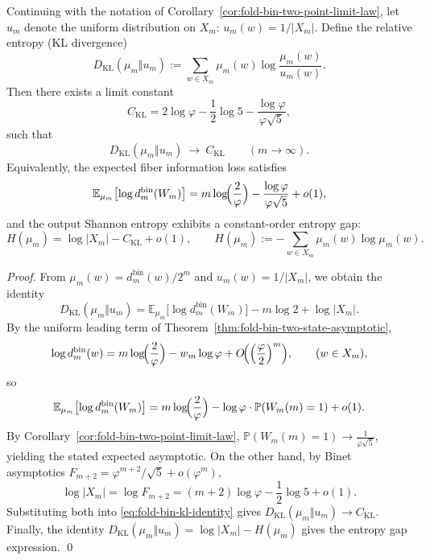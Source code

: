 \begin{proposition}\label{prop:fold-bin-kl-constant}
Continuing with the notation of Corollary~\ref{cor:fold-bin-two-point-limit-law},
let \(u_m\) denote the uniform distribution on \(X_m\): \(u_m(w)=1/|X_m|\).
Define the relative entropy (KL divergence)
\[
D_{\mathrm{KL}}(\mu_m\Vert u_m)
:=\sum_{w\in X_m}\mu_m(w)\log\frac{\mu_m(w)}{u_m(w)}.
\]
Then there exists a limit constant
\[
C_{\mathrm{KL}}
=2\log\varphi-\frac12\log 5-\frac{\log\varphi}{\varphi\sqrt5},
\]
such that
\[
D_{\mathrm{KL}}(\mu_m\Vert u_m)\ \longrightarrow\ C_{\mathrm{KL}}
\qquad(m\to\infty).
\]
Equivalently, the expected fiber information loss satisfies
\[
\mathbb{E}_{\mu_m}\bigl[\log d^{\mathrm{bin}}_m(W_m)\bigr]
=m\log\!\Bigl(\frac{2}{\varphi}\Bigr)-\frac{\log\varphi}{\varphi\sqrt5}+o(1),
\]
and the output Shannon entropy exhibits a constant-order entropy gap:
\[
H(\mu_m)=\log|X_m|-C_{\mathrm{KL}}+o(1),
\qquad
H(\mu_m):=-\sum_{w\in X_m}\mu_m(w)\log \mu_m(w).
\]
\end{proposition}

\begin{proof}
From \(\mu_m(w)=d^{\mathrm{bin}}_m(w)/2^m\) and \(u_m(w)=1/|X_m|\), we obtain the identity
\begin{equation}\label{eq:fold-bin-kl-identity}
D_{\mathrm{KL}}(\mu_m\Vert u_m)
=\mathbb{E}_{\mu_m}\bigl[\log d^{\mathrm{bin}}_m(W_m)\bigr]-m\log 2+\log|X_m|.
\end{equation}
By the uniform leading term of Theorem~\ref{thm:fold-bin-two-state-asymptotic},
\[
\log d^{\mathrm{bin}}_m(w)
=m\log\!\Bigl(\frac{2}{\varphi}\Bigr)-w_m\log\varphi+O\!\Bigl(\Bigl(\frac{\varphi}{2}\Bigr)^m\Bigr),
\qquad (w\in X_m),
\]
so
\[
\mathbb{E}_{\mu_m}\bigl[\log d^{\mathrm{bin}}_m(W_m)\bigr]
=m\log\!\Bigl(\frac{2}{\varphi}\Bigr)-\log\varphi\cdot \mathbb{P}(W_m(m)=1)+o(1).
\]
By Corollary~\ref{cor:fold-bin-two-point-limit-law}, \(\mathbb{P}(W_m(m)=1)\to \frac{1}{\varphi\sqrt5}\), yielding the stated expected asymptotic.
On the other hand, by Binet asymptotics \(F_{m+2}=\varphi^{m+2}/\sqrt5+o(\varphi^m)\),
\[
\log|X_m|=\log F_{m+2}=(m+2)\log\varphi-\frac12\log 5+o(1).
\]
Substituting both into \eqref{eq:fold-bin-kl-identity} gives \(D_{\mathrm{KL}}(\mu_m\Vert u_m)\to C_{\mathrm{KL}}\).
Finally, the identity \(D_{\mathrm{KL}}(\mu_m\Vert u_m)=\log|X_m|-H(\mu_m)\) gives the entropy gap expression. \qed
\end{proof}

